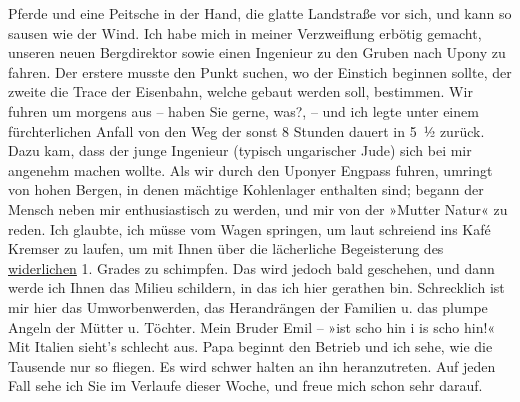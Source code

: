 \begin{ledgroupsized}[t]{13cm}
               Pferde und eine Peitsche in der Hand, die glatte Landstraße vor sich, und kann so
               sausen wie der Wind. Ich habe mich in meiner Verzweiflung erbötig gemacht, unseren
               neuen Bergdirektor sowie
               einen Ingenieur  zu den
               Gruben nach Upony zu fahren. Der erstere
               musste den Punkt suchen, wo der Einstich beginnen sollte, der zweite die Trace der
               Eisenbahn, welche gebaut werden soll, bestimmen. Wir fuhren um  morgens aus – haben Sie gerne, was?, – und ich legte unter einem
               fürchterlichen Anfall von \label{K_L03105-11v}\label{K_L03105-11h} den Weg der sonst
               8 Stunden dauert in 5 ½ zurück. Dazu kam, dass der junge Ingenieur (typisch ungarischer Jude) sich
               bei mir angenehm machen wollte. Als wir durch den Uponyer Engpass fuhren, umringt von hohen Bergen, in denen mächtige
               Kohlenlager enthalten sind; be{\pb}gann der Mensch neben mir enthusiastisch zu werden, und mir von der »Mutter Natur«
               zu reden. Ich glaubte, ich müsse vom Wagen springen, um laut schreiend ins Kafé Kremser zu laufen, um mit Ihnen über die
               lächerliche Begeisterung des \uline{widerlichen} 1. Grades zu
               schimpfen. Das wird jedoch bald geschehen, und dann werde ich Ihnen das Milieu
               schildern, in das ich hier gerathen bin. Schrecklich ist mir hier das Umworbenwerden,
               das Herandrängen der Familien u. das plumpe Angeln der Mütter u. Töchter. Mein Bruder
                  Emil – »ist scho hin i is scho hin!«\pend
           \pstart
           Mit Italien sieht's schlecht aus. Papa beginnt den Betrieb und ich sehe, wie die
               Tausende nur so fliegen. Es wird schwer halten an ihn heranzutreten. Auf jeden Fall
               sehe ich Sie im Verlaufe dieser Woche, und freue mich schon sehr darauf. \pend

\end{ledgroupsized}
